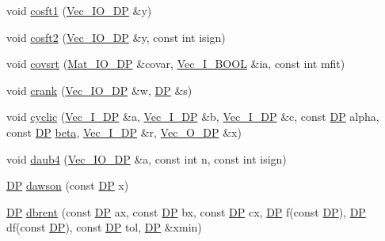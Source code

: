 \begin{DoxyCompactItemize}
\item 
void \mbox{\hyperlink{namespaceNR_a3359e0c5092d8ab9afdbec3c55066b61}{cosft1}} (\mbox{\hyperlink{namespaceNR_ab293e06a6bf799d8a7ed932b6852bcb8}{Vec\+\_\+\+I\+O\+\_\+\+DP}} \&y)
\item 
void \mbox{\hyperlink{namespaceNR_a86490ad17a4fd0e6d60ea67f2588fd00}{cosft2}} (\mbox{\hyperlink{namespaceNR_ab293e06a6bf799d8a7ed932b6852bcb8}{Vec\+\_\+\+I\+O\+\_\+\+DP}} \&y, const int isign)
\item 
void \mbox{\hyperlink{namespaceNR_ac2f90a8cf35f76c733d46d6c217e7698}{covsrt}} (\mbox{\hyperlink{namespaceNR_ad1513aa4697878ed3bff0b8b3c9dd910}{Mat\+\_\+\+I\+O\+\_\+\+DP}} \&covar, \mbox{\hyperlink{namespaceNR_a70331f3de2cf735819b5719e4048d7f3}{Vec\+\_\+\+I\+\_\+\+B\+O\+OL}} \&ia, const int mfit)
\item 
void \mbox{\hyperlink{namespaceNR_a62558f3207c569f0bb176c97de157616}{crank}} (\mbox{\hyperlink{namespaceNR_ab293e06a6bf799d8a7ed932b6852bcb8}{Vec\+\_\+\+I\+O\+\_\+\+DP}} \&w, \mbox{\hyperlink{namespaceNR_af6ff762dd605ff477b8e52387253a02a}{DP}} \&s)
\item 
void \mbox{\hyperlink{namespaceNR_abe6af2a0141e9c645da6b86e995dfe82}{cyclic}} (\mbox{\hyperlink{namespaceNR_a9f943da53862537c552e2a770cb170ae}{Vec\+\_\+\+I\+\_\+\+DP}} \&a, \mbox{\hyperlink{namespaceNR_a9f943da53862537c552e2a770cb170ae}{Vec\+\_\+\+I\+\_\+\+DP}} \&b, \mbox{\hyperlink{namespaceNR_a9f943da53862537c552e2a770cb170ae}{Vec\+\_\+\+I\+\_\+\+DP}} \&c, const \mbox{\hyperlink{namespaceNR_af6ff762dd605ff477b8e52387253a02a}{DP}} alpha, const \mbox{\hyperlink{namespaceNR_af6ff762dd605ff477b8e52387253a02a}{DP}} \mbox{\hyperlink{namespaceNR_a060c1496967431dfd707b603985a33b7}{beta}}, \mbox{\hyperlink{namespaceNR_a9f943da53862537c552e2a770cb170ae}{Vec\+\_\+\+I\+\_\+\+DP}} \&r, \mbox{\hyperlink{namespaceNR_a970094d23441f8ef6a45282a7eb2103d}{Vec\+\_\+\+O\+\_\+\+DP}} \&x)
\item 
void \mbox{\hyperlink{namespaceNR_afb5a6ee4e921ad8ae733cd25c9178abf}{daub4}} (\mbox{\hyperlink{namespaceNR_ab293e06a6bf799d8a7ed932b6852bcb8}{Vec\+\_\+\+I\+O\+\_\+\+DP}} \&a, const int n, const int isign)
\item 
\mbox{\hyperlink{namespaceNR_af6ff762dd605ff477b8e52387253a02a}{DP}} \mbox{\hyperlink{namespaceNR_a6e1128d2427bfc7d48d0f09057399227}{dawson}} (const \mbox{\hyperlink{namespaceNR_af6ff762dd605ff477b8e52387253a02a}{DP}} x)
\item 
\mbox{\hyperlink{namespaceNR_af6ff762dd605ff477b8e52387253a02a}{DP}} \mbox{\hyperlink{namespaceNR_af1d68c637282cf655b5c683b052a0b6d}{dbrent}} (const \mbox{\hyperlink{namespaceNR_af6ff762dd605ff477b8e52387253a02a}{DP}} ax, const \mbox{\hyperlink{namespaceNR_af6ff762dd605ff477b8e52387253a02a}{DP}} bx, const \mbox{\hyperlink{namespaceNR_af6ff762dd605ff477b8e52387253a02a}{DP}} cx, \mbox{\hyperlink{namespaceNR_af6ff762dd605ff477b8e52387253a02a}{DP}} f(const \mbox{\hyperlink{namespaceNR_af6ff762dd605ff477b8e52387253a02a}{DP}}), \mbox{\hyperlink{namespaceNR_af6ff762dd605ff477b8e52387253a02a}{DP}} df(const \mbox{\hyperlink{namespaceNR_af6ff762dd605ff477b8e52387253a02a}{DP}}), const \mbox{\hyperlink{namespaceNR_af6ff762dd605ff477b8e52387253a02a}{DP}} tol, \mbox{\hyperlink{namespaceNR_af6ff762dd605ff477b8e52387253a02a}{DP}} \&xmin)

\end{DoxyCompactItemize}
